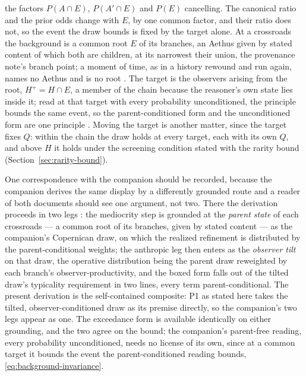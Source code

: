 the factors $P(A \cap E)$, $P(A' \cap E)$ and $P(E)$ cancelling. The canonical ratio and the prior odds change with $E$, by one common factor, and their ratio does not, so the event the draw bounds is fixed by the target alone. At a crossroads the background is a common root $E$ of its branches, an Aethus given by stated content of which both are children, at its narrowest their union, the provenance note's branch point; a moment of time, as in a history rewound and run again, names no Aethus and is no root \cite{Nexus}. The target is the observers arising from the root, $H^{+} = H \cap E$, a member of the chain because the reasoner's own state lies inside it; read at that target with every probability unconditioned, the principle bounds the same event, so the parent-conditioned form and the unconditioned form are one principle \cite{Nexus}. Moving the target is another matter, since the target fixes $Q$: within the chain the draw holds at every target, each with its own $Q$, and above $H$ it holds under the screening condition stated with the rarity bound (Section~\ref{sec:rarity-bound}).

One correspondence with the companion should be recorded, because the companion derives the same display by a differently grounded route and a reader of both documents should see one argument, not two. There the derivation proceeds in two legs \cite{Nexus}: the mediocrity step is grounded at the \emph{parent state} of each crossroads --- a common root of its branches, given by stated content --- as the companion's Copernican draw, on which the realized refinement is distributed by the parent-conditional weights; the anthropic leg then enters as the \emph{observer tilt} on that draw, the operative distribution being the parent draw reweighted by each branch's observer-productivity, and the boxed form falls out of the tilted draw's typicality requirement in two lines, every term parent-conditional. The present derivation is the self-contained composite: P1 as stated here takes the tilted, observer-conditioned draw as its premise directly, so the companion's two legs appear as one. The exceedance form is available identically on either grounding, and the two agree on the bound; the companion's parent-free reading, every probability unconditioned, needs no license of its own, since at a common target it bounds the event the parent-conditioned reading bounds, \eqref{eq:background-invariance}.

